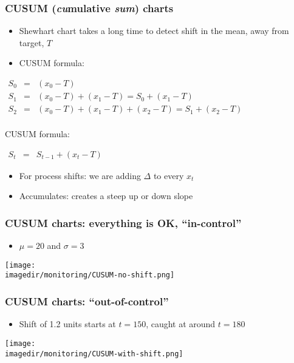 \begin{frame}\frametitle{CUSUM (\emph{\textbf{cu}}mulative \emph{\textbf{sum}}) charts}
	\begin{itemize}
		\item	Shewhart chart takes a long time to detect shift in the mean, away from target, $T$
		\item	CUSUM formula:
	\end{itemize}
	$
	\begin{array}{rcl}
		S_0 &=& (x_0 - T) \\
		S_1 &=& (x_0 - T) + (x_1 - T) = S_0 + (x_1 - T) \\
		S_2 &=& (x_0 - T) + (x_1 - T) + (x_2 - T) = S_1 + (x_2 - T) \\
	\end{array}
	$
	\begin{block}
		{CUSUM formula:}
		\begin{center}
			$
			\begin{array}{rcl}
				S_t &=& S_{t-1} + (x_t - T)
			\end{array}
			$
		\end{center}
	\end{block}
	\begin{itemize}
		\item	For process shifts: we are adding $\Delta$ to every $x_t$
		\item	Accumulates: creates a steep up or down slope
	\end{itemize}
\end{frame}

\begin{frame}\frametitle{CUSUM charts: everything is OK, ``in-control''}
	\begin{itemize}
		\item	$\mu=20$ and $\sigma=3$
	\end{itemize}
	\begin{center}
		\texttt{[image: \\imagedir/monitoring/CUSUM-no-shift.png]}
	\end{center}
\end{frame}

\begin{frame}\frametitle{CUSUM charts: ``out-of-control''}
	\begin{itemize}
		\item	Shift of 1.2 units starts at $t=150$, caught at around $t=180$
	\end{itemize}
	\begin{center}
		\texttt{[image: \\imagedir/monitoring/CUSUM-with-shift.png]}
	\end{center}
\end{frame}

